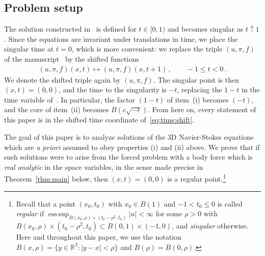 \documentclass[11pt,reqno]{amsproc}
\numberwithin{equation}{section}
\theoremstyle{remark}
\newcommand{\RR}{\mathbb R}
\newcommand{\esssup}{\operatorname*{ess\,sup}}
\begin{document}
\subsection{Problem setup}
\label{sec:aniso:setup}

The solution constructed in~\cite{OpenAIManuscript} is defined for $t\in[0,1)$ and becomes singular as $t\uparrow1$. Since the equations are invariant under translations in time, we place the singular time at $t=0$, which is more convenient: we replace the triple $(u,\pi,f)$ of the manuscript~\cite{OpenAIManuscript} by the shifted functions
\begin{align}
(u,\pi,f)(x,t)\longmapsto(u,\pi,f)(x,t+1)
\,,\qquad -1\le t<0
\,.
\label{eq:time:shift}
\end{align}
We denote the shifted triple again by $(u,\pi,f)$. The singular point is then $(x,t)=(0,0)$, and the time to the singularity is $-t$, replacing the $1-t$ in the time variable of~\cite{OpenAIManuscript}. In particular, the factor $(1-t)$ of item~(i) becomes $(-t)$, and the core of item~(ii) becomes $B(c\sqrt{-t})$. From here on, every statement of this paper is in the shifted time coordinate of~\eqref{eq:time:shift}. 

The goal of this paper is to analyze solutions of the 3D Navier-Stokes equations which are \emph{a priori} assumed to obey properties (i) and (ii) above. We prove that if such solutions were to arise from the forced problem with a body force which is \emph{real analytic} in the space variables, in the sense made precise in Theorem~\ref{thm:main} below, then $(x,t)=(0,0)$ is a regular point.\footnote{Recall that a point $(x_0,t_0)$ with $x_0\in B(1)$ and $-1<t_0\le0$ is called \emph{regular} if $\esssup_{B(x_0,\rho)\times(t_0-\rho^2,t_0)}|u|<\infty$ for some $\rho>0$ with $B(x_0,\rho)\times(t_0-\rho^2,t_0)\subset B(0,1)\times(-1,0)$, and \emph{singular} otherwise. Here and throughout this paper, we use the notation $B(x,\rho)=\{y\in\RR^3:|y-x|<\rho\}$ and $B(\rho)=B(0,\rho)$.} 
\end{document}
